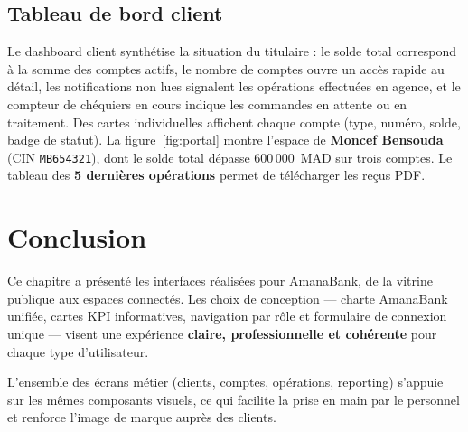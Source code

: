 \documentclass[11pt,a4paper,oneside]{report}
\newcommand{\nomapplication}{AmanaBank}
\begin{document}
\subsection{Tableau de bord client}

Le dashboard client synthétise la situation du titulaire : le solde total correspond à la somme des comptes actifs, le nombre de comptes ouvre un accès rapide au détail, les notifications non lues signalent les opérations effectuées en agence, et le compteur de chéquiers en cours indique les commandes en attente ou en traitement. Des cartes individuelles affichent chaque compte (type, numéro, solde, badge de statut). La figure~\ref{fig:portal} montre l'espace de \textbf{Moncef Bensouda} (CIN \texttt{MB654321}), dont le solde total dépasse 600\,000~MAD sur trois comptes. Le tableau des \textbf{5 dernières opérations} permet de télécharger les reçus PDF.



\section{Conclusion}

Ce chapitre a présenté les interfaces réalisées pour \nomapplication, de la vitrine publique aux espaces connectés. Les choix de conception — charte AmanaBank unifiée, cartes KPI informatives, navigation par rôle et formulaire de connexion unique — visent une expérience \textbf{claire, professionnelle et cohérente} pour chaque type d'utilisateur.

L'ensemble des écrans métier (clients, comptes, opérations, reporting) s'appuie sur les mêmes composants visuels, ce qui facilite la prise en main par le personnel et renforce l'image de marque auprès des clients.
\end{document}
